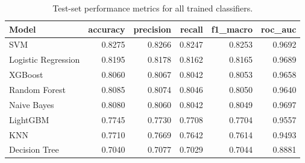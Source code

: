 \begin{table}[htbp]
  \centering
  \caption{Test-set performance metrics for all trained classifiers.}
  \label{tab:model_comparison}
  \begin{tabular}{lrrrrr}
    \toprule
    Model & accuracy & precision & recall & f1_macro & roc_auc \\
    \midrule
    SVM & 0.8275 & 0.8266 & 0.8247 & 0.8253 & 0.9692 \\
    Logistic Regression & 0.8195 & 0.8178 & 0.8162 & 0.8165 & 0.9689 \\
    XGBoost & 0.8060 & 0.8067 & 0.8042 & 0.8053 & 0.9658 \\
    Random Forest & 0.8085 & 0.8074 & 0.8046 & 0.8050 & 0.9640 \\
    Naive Bayes & 0.8080 & 0.8060 & 0.8042 & 0.8049 & 0.9697 \\
    LightGBM & 0.7745 & 0.7730 & 0.7708 & 0.7704 & 0.9557 \\
    KNN & 0.7710 & 0.7669 & 0.7642 & 0.7614 & 0.9493 \\
    Decision Tree & 0.7040 & 0.7077 & 0.7029 & 0.7044 & 0.8881 \\
    \bottomrule
  \end{tabular}
\end{table}